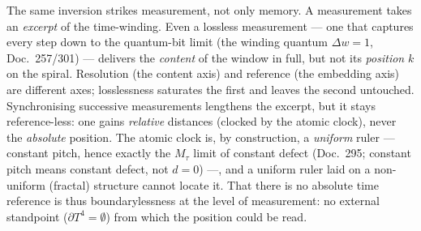The same inversion strikes measurement, not only memory. A measurement takes an
\emph{excerpt} of the time-winding. Even a lossless measurement --- one that captures every
step down to the quantum-bit limit (the winding quantum $\Delta w = 1$, Doc.~257/301) ---
delivers the \emph{content} of the window in full, but not its \emph{position} $k$ on the
spiral. Resolution (the content axis) and reference (the embedding axis) are different axes;
losslessness saturates the first and leaves the second untouched. Synchronising successive
measurements lengthens the excerpt, but it stays reference-less: one gains \emph{relative}
distances (clocked by the atomic clock), never the \emph{absolute} position. The atomic
clock is, by construction, a \emph{uniform} ruler --- constant pitch, hence exactly the
$M_\tau$ limit of constant defect (Doc.~295; constant pitch means constant defect,
not $d = 0$) ---, and a uniform ruler laid on a non-uniform (fractal)
structure cannot locate it. That there is no absolute time reference is thus boundarylessness
at the level of measurement: no external standpoint ($\partial T^4 = \emptyset$) from which
the position could be read.

